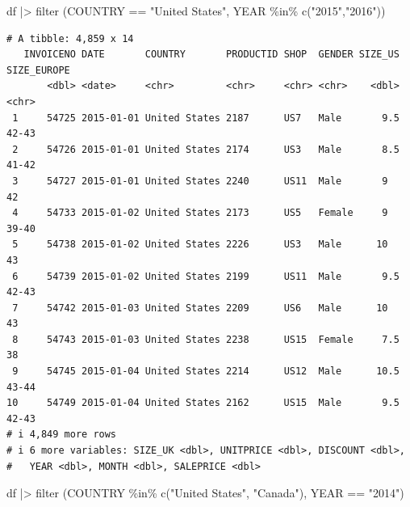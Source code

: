 \documentclass[
  letterpaper,
  DIV=11,
  numbers=noendperiod]{scrreprt}
\newenvironment{Shaded}{\begin{snugshade}}{\end{snugshade}}
\newcommand{\FunctionTok}[1]{\textcolor[rgb]{0.28,0.35,0.67}{#1}}
\newcommand{\NormalTok}[1]{\textcolor[rgb]{0.00,0.23,0.31}{#1}}
\newcommand{\SpecialCharTok}[1]{\textcolor[rgb]{0.37,0.37,0.37}{#1}}
\newcommand{\StringTok}[1]{\textcolor[rgb]{0.13,0.47,0.30}{#1}}
\begin{document}
\begin{Shaded}
\begin{Highlighting}[]
\NormalTok{df }\SpecialCharTok{|\textgreater{}} \FunctionTok{filter}\NormalTok{ (COUNTRY }\SpecialCharTok{==} \StringTok{"United States"}\NormalTok{, YEAR }\SpecialCharTok{\%in\%} \FunctionTok{c}\NormalTok{(}\StringTok{"2015"}\NormalTok{,}\StringTok{"2016"}\NormalTok{))}
\end{Highlighting}
\end{Shaded}

\begin{verbatim}
# A tibble: 4,859 x 14
   INVOICENO DATE       COUNTRY       PRODUCTID SHOP  GENDER SIZE_US SIZE_EUROPE
       <dbl> <date>     <chr>         <chr>     <chr> <chr>    <dbl> <chr>      
 1     54725 2015-01-01 United States 2187      US7   Male       9.5 42-43      
 2     54726 2015-01-01 United States 2174      US3   Male       8.5 41-42      
 3     54727 2015-01-01 United States 2240      US11  Male       9   42         
 4     54733 2015-01-02 United States 2173      US5   Female     9   39-40      
 5     54738 2015-01-02 United States 2226      US3   Male      10   43         
 6     54739 2015-01-02 United States 2199      US11  Male       9.5 42-43      
 7     54742 2015-01-03 United States 2209      US6   Male      10   43         
 8     54743 2015-01-03 United States 2238      US15  Female     7.5 38         
 9     54745 2015-01-04 United States 2214      US12  Male      10.5 43-44      
10     54749 2015-01-04 United States 2162      US15  Male       9.5 42-43      
# i 4,849 more rows
# i 6 more variables: SIZE_UK <dbl>, UNITPRICE <dbl>, DISCOUNT <dbl>,
#   YEAR <dbl>, MONTH <dbl>, SALEPRICE <dbl>
\end{verbatim}

\begin{Shaded}
\begin{Highlighting}[]
\NormalTok{df }\SpecialCharTok{|\textgreater{}} \FunctionTok{filter}\NormalTok{ (COUNTRY }\SpecialCharTok{\%in\%} \FunctionTok{c}\NormalTok{(}\StringTok{"United States"}\NormalTok{, }\StringTok{"Canada"}\NormalTok{), YEAR }\SpecialCharTok{==} \StringTok{"2014"}\NormalTok{)}
\end{Highlighting}
\end{Shaded}
\end{document}
